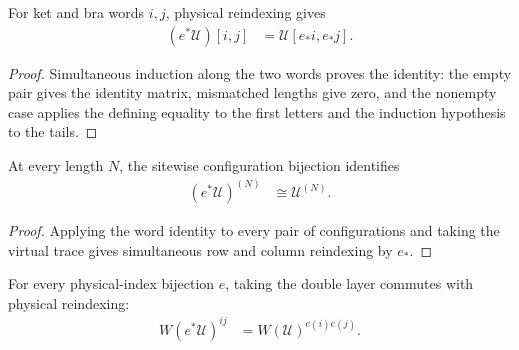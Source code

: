 \begin{lemma}
    \label{thm:mpu_eval_word_physical_reindexing}
    \leanok
    For ket and bra words $i,j$, physical reindexing gives
    \begin{align}
        (e^*\mathcal U)[i,j] & =\mathcal U[e_*i,e_*j].
    \end{align}
\end{lemma}

\begin{proof}\leanok
    Simultaneous induction along the two words proves the identity: the empty pair gives the
    identity matrix, mismatched lengths give zero, and the nonempty case
    applies the defining equality to the first letters and the induction
    hypothesis to the tails.
\end{proof}

\begin{lemma}
    \label{thm:mpu_finite_size_physical_reindexing}
    \leanok
    At every length $N$, the sitewise configuration bijection identifies
    \begin{align}
        (e^*\mathcal U)^{(N)} & \cong\mathcal U^{(N)}.
    \end{align}
\end{lemma}

\begin{proof}\leanok
    Applying the word identity to every pair of configurations and taking the
    virtual trace gives simultaneous row and column reindexing by $e_*$.
\end{proof}

\begin{lemma}
    \label{thm:mpu_double_layer_physical_reindexing}
    \leanok
    For every physical-index bijection $e$, taking the double layer commutes
    with physical reindexing:
    \begin{align}
        W(e^*\mathcal U)^{ij} & =W(\mathcal U)^{e(i)e(j)}.
    \end{align}
\end{lemma}

